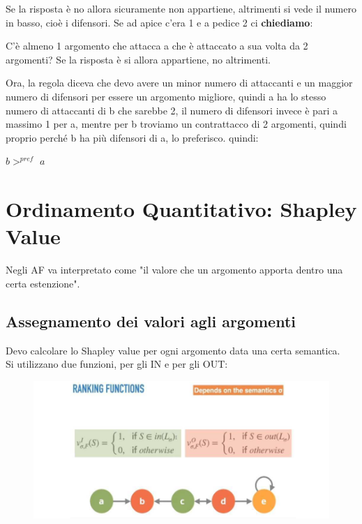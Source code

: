     \noindent Se la risposta è no allora sicuramente non appartiene, altrimenti si vede il numero in basso, cioè i difensori.
    \vspace{0.3cm}
    \noindent Se ad apice c'era 1 e a pedice 2 ci \textbf{chiediamo}:

    \vspace{0.3cm}

    \noindent C'è almeno 1 argomento che attacca a che è attaccato a sua volta da 2 argomenti? Se la risposta è si allora appartiene, no altrimenti.

    \vspace{0.3cm}

    \noindent Ora, la regola diceva che devo avere un minor numero di attaccanti e un maggior numero di difensori per essere un argomento migliore, quindi a ha lo stesso numero di attaccanti di b che sarebbe 2, il numero di difensori invece è pari a massimo 1 per a, mentre per b troviamo un contrattacco di 2
    argomenti, quindi proprio perché b ha più difensori di a, lo preferisco. quindi:
    \begin{center}
        $b >^{pref}$ $a$
    \end{center}
    \section{Ordinamento Quantitativo: Shapley Value}
    Negli AF va interpretato come "il valore che un argomento apporta dentro una certa estenzione".
    \subsection{Assegnamento dei valori agli argomenti}
    Devo calcolare lo Shapley value per ogni argomento data una certa semantica.
    \\
    Si utilizzano due funzioni, per gli IN e per gli OUT:
    \begin{figure}[H]
        \centering
        \includegraphics[width=13cm, keepaspectratio]{img/Cap8/ordinamento-quantitativo.png}
    \end{figure}

